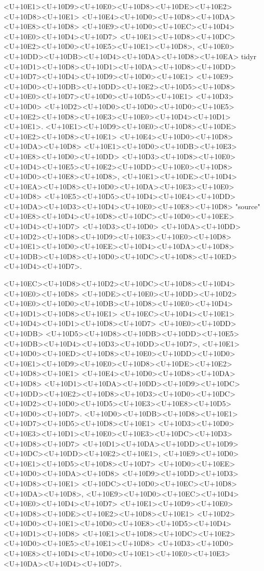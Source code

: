 \documentclass{article}
\begin{document}
<U+10E1><U+10D9><U+10E0><U+10D8><U+10DE><U+10E2><U+10D8><U+10E1> <U+10E4><U+10D0><U+10D8><U+10DA><U+10E8><U+10D8> <U+10E9><U+10D0><U+10EC><U+10D4><U+10E0><U+10D4><U+10D7> <U+10E1><U+10D8><U+10DC><U+10E2><U+10D0><U+10E5><U+10E1><U+10D8>, <U+10E0><U+10DD><U+10DB><U+10D4><U+10DA><U+10D8><U+10EA> tidyr <U+10D1><U+10D8><U+10D1><U+10DA><U+10D8><U+10DD><U+10D7><U+10D4><U+10D9><U+10D0><U+10E1> <U+10E9><U+10D0><U+10DB><U+10DD><U+10E2><U+10D5><U+10D8><U+10E0><U+10D7><U+10D0><U+10D5><U+10E1> <U+10D3><U+10D0> <U+10D2><U+10D0><U+10D0><U+10D0><U+10E5><U+10E2><U+10D8><U+10E3><U+10E0><U+10D4><U+10D1><U+10E1>. <U+10E1><U+10D9><U+10E0><U+10D8><U+10DE><U+10E2><U+10D8><U+10E1> <U+10E4><U+10D0><U+10D8><U+10DA><U+10D8> <U+10E1><U+10D0><U+10DB><U+10E3><U+10E8><U+10D0><U+10DD> <U+10D3><U+10D8><U+10E0><U+10D4><U+10E5><U+10E2><U+10DD><U+10E0><U+10D8><U+10D0><U+10E8><U+10D8>, <U+10E1><U+10DE><U+10D4><U+10EA><U+10D8><U+10D0><U+10DA><U+10E3><U+10E0><U+10D8> <U+10E5><U+10D5><U+10D4><U+10E4><U+10DD><U+10DA><U+10D3><U+10D4><U+10E0><U+10E8><U+10D8> "source" <U+10E8><U+10D4><U+10D8><U+10DC><U+10D0><U+10EE><U+10D4><U+10D7> <U+10D3><U+10D0> <U+10DA><U+10DD><U+10D2><U+10D8><U+10D9><U+10E3><U+10E0><U+10D8> <U+10E1><U+10D0><U+10EE><U+10D4><U+10DA><U+10D8> <U+10DB><U+10D8><U+10D0><U+10DC><U+10D8><U+10ED><U+10D4><U+10D7>.

<U+10EC><U+10D8><U+10D2><U+10DC><U+10D8><U+10D4><U+10E0><U+10D8> <U+10DE><U+10E0><U+10DD><U+10D2><U+10E0><U+10D0><U+10DB><U+10D8><U+10E0><U+10D4><U+10D1><U+10D8><U+10E1> <U+10EC><U+10D4><U+10E1><U+10D4><U+10D1><U+10D8><U+10D7> <U+10E0><U+10DD><U+10DB> <U+10D5><U+10D8><U+10DB><U+10DD><U+10E5><U+10DB><U+10D4><U+10D3><U+10DD><U+10D7>, <U+10E1><U+10D0><U+10ED><U+10D8><U+10E0><U+10DD><U+10D0> <U+10E1><U+10D9><U+10E0><U+10D8><U+10DE><U+10E2><U+10D8><U+10E1> <U+10E4><U+10D0><U+10D8><U+10DA><U+10D8> <U+10D1><U+10DA><U+10DD><U+10D9><U+10DC><U+10DD><U+10E2><U+10D8><U+10D3><U+10D0><U+10DC> <U+10D2><U+10D0><U+10D5><U+10E3><U+10E8><U+10D5><U+10D0><U+10D7>. <U+10D0><U+10DB><U+10D8><U+10E1><U+10D7><U+10D5><U+10D8><U+10E1> <U+10D3><U+10D0><U+10E3><U+10D1><U+10E0><U+10E3><U+10DC><U+10D3><U+10D8><U+10D7> <U+10D1><U+10DA><U+10DD><U+10D9><U+10DC><U+10DD><U+10E2><U+10E1>, <U+10E9><U+10D0><U+10E1><U+10D5><U+10D8><U+10D7> <U+10D0><U+10EE><U+10D0><U+10DA><U+10D8> <U+10D9><U+10DD><U+10D3><U+10D8><U+10E1> <U+10DC><U+10D0><U+10EC><U+10D8><U+10DA><U+10D8>, <U+10E9><U+10D0><U+10EC><U+10D4><U+10E0><U+10D4><U+10D7> <U+10E1><U+10D9><U+10E0><U+10D8><U+10DE><U+10E2><U+10D8><U+10E1> <U+10D2><U+10D0><U+10E1><U+10D0><U+10E8><U+10D5><U+10D4><U+10D1><U+10D8> <U+10E1><U+10D8><U+10DC><U+10E2><U+10D0><U+10E5><U+10E1><U+10D8> <U+10D3><U+10D0> <U+10E8><U+10D4><U+10D0><U+10E1><U+10E0><U+10E3><U+10DA><U+10D4><U+10D7>.
\end{document}
